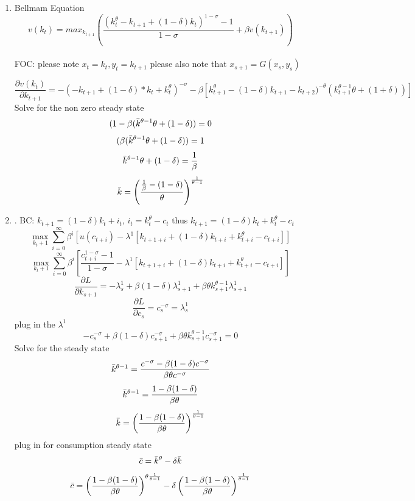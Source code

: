 \begin{enumerate}
    \item  Bellmam Equation $$v(k_t)= max_{k_{t+1}} \left(\frac{(k_t^\theta -k_{t+1}+(1-\delta)k_t)^{1-\sigma}-1}{1-\sigma}+\beta v(k_{t+1}) \right)$$\\
    FOC: please note $x_t=k_t, y_t=k_{t+1}$ please also note that $x_{s+1}=G(x_s,y_s)$
    
    $$\frac{\partial v(k_t)}{\partial k_{t+1}}=-( -k_{t+1} + (1-\delta)*k_t +k_t^\theta)^{-\sigma}
   -\beta[k_{t+1}^\theta-(1-\delta)k_{t+1}-k_{t+2})^{-\theta}(k^{\theta-1}_{t+1}\theta+(1+\delta))]$$
   Solve for the non zero steady state 
   $$(1-\beta(\Bar{k}^{\theta-1}\theta+(1-\delta))=0$$
   $$(\beta(\Bar{k}^{\theta-1}\theta+(1-\delta))=1$$
   $$\Bar{k}^{\theta-1}\theta+(1-\delta)=\frac{1}{\beta}$$
   $$\Bar{k}=\left( \frac{\frac{1}{\beta}-(1-\delta)}{\theta}\right) ^{\frac{1}{\theta-1}}$$
   \item. BC: $k_{t+1} =(1-\delta)k_t+i_t$, $i_t=k_t^\theta-c_t$ thus $k_{t+1}=(1-\delta)k_t+k_t^\theta-c_t$
   $$\max_{k_t+1} \sum^\infty_{i=0} \beta^i[u(c_{t+i})-\lambda^1[k_{t+1+i}+(1-\delta)k_{t+i}+k_{t+i}^\theta-c_{t+i}]]$$
   $$\max_{k_t+1} \sum^\infty_{i=0} \beta^i[\frac{c_{t+i}^{1-\sigma}-1}{1-\sigma}-\lambda^1[k_{t+1+i}+(1-\delta)k_{t+i}+k_{t+i}^\theta-c_{t+i}]]$$
   $$\frac{\partial L}{\partial k_{s+1}}= -\lambda^1_s+\beta(1-\delta)\lambda^1_{s+1}+\beta \theta k^{\theta-1}_{s+1}\lambda^1_{s+1}$$
   $$\frac{\partial L}{\partial c_s}= c_s^{-\sigma}=\lambda^1_s$$
   plug in the $\lambda^1$ 
   $$-c_s^{-\sigma}+\beta(1-\delta)c_{s+1}^{-\sigma}+\beta \theta k_{s+1}^{\theta -1} c_{s+1}^{-\sigma}=0$$
   Solve for the steady state 
   $$\Bar{k}^{\theta-1}=\frac{ c^{-\sigma} -\beta(1-\delta)c^{-\sigma}}{\beta \theta c^{-\sigma}}$$
   $$\Bar{k}^{\theta-1}=\frac{1 -\beta(1-\delta)}{\beta \theta}$$
   $$\Bar{k}=\left (\frac{1 -\beta(1-\delta)}{\beta \theta} \right )^{\frac{1}{\theta-1}}$$
   plug in for consumption steady state
   $$\Bar{c}= \Bar{k}^\theta-\delta\Bar{k}$$
   $$\Bar{c}= \left (\frac{1 -\beta(1-\delta)}{\beta \theta} \right )^{\theta \frac{1}{\theta-1}}-\delta\left (\frac{1 -\beta(1-\delta)}{\beta \theta} \right )^{\frac{1}{\theta-1}}$$


\end{enumerate}
